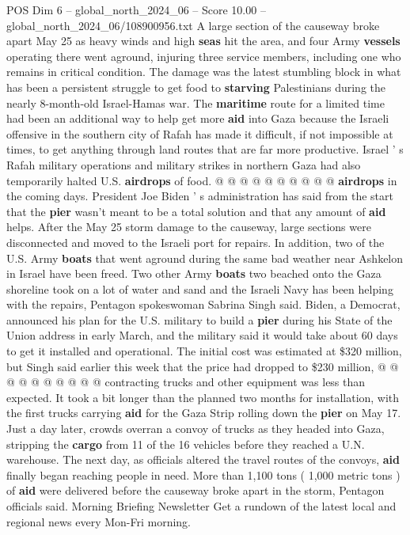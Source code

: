 \begin{textsample}{POS Dim 6 – global\_north\_2024\_06 – Score 10.00 – global\_north\_2024\_06/108900956.txt}
A large section of the causeway broke apart May 25 as heavy winds and high \textbf{seas} hit the area, and four Army \textbf{vessels} operating there went aground, injuring three service members, including one who remains in critical condition.
The damage was the latest stumbling block in what has been a persistent struggle to get food to \textbf{starving} Palestinians during the nearly 8-month-old Israel-Hamas war.
The \textbf{maritime} route for a limited time had been an additional way to help get more \textbf{aid} into Gaza because the Israeli offensive in the southern city of Rafah has made it difficult, if not impossible at times, to get anything through land routes that are far more productive.
Israel ' s Rafah military operations and military strikes in northern Gaza had also temporarily halted U.S. \textbf{airdrops} of food. @ @ @ @ @ @ @ @ @ @ \textbf{airdrops} in the coming days.
President Joe Biden ' s administration has said from the start that the \textbf{pier} wasn't meant to be a total solution and that any amount of \textbf{aid} helps.
After the May 25 storm damage to the causeway, large sections were disconnected and moved to the Israeli port for repairs.
In addition, two of the U.S.
Army \textbf{boats} that went aground during the same bad weather near Ashkelon in Israel have been freed.
Two other Army \textbf{boats} two beached onto the Gaza shoreline took on a lot of water and sand and the Israeli Navy has been helping with the repairs, Pentagon spokeswoman Sabrina Singh said.
Biden, a Democrat, announced his plan for the U.S. military to build a \textbf{pier} during his State of the Union address in early March, and the military said it would take about 60 days to get it installed and operational.
The initial cost was estimated at \$320 million, but Singh said earlier this week that the price had dropped to \$230 million, @ @ @ @ @ @ @ @ @ @ contracting trucks and other equipment was less than expected.
It took a bit longer than the planned two months for installation, with the first trucks carrying \textbf{aid} for the Gaza Strip rolling down the \textbf{pier} on May 17.
Just a day later, crowds overran a convoy of trucks as they headed into Gaza, stripping the \textbf{cargo} from 11 of the 16 vehicles before they reached a U.N. warehouse.
The next day, as officials altered the travel routes of the convoys, \textbf{aid} finally began reaching people in need.
More than 1,100 tons ( 1,000 metric tons ) of \textbf{aid} were delivered before the causeway broke apart in the storm, Pentagon officials said.
Morning Briefing Newsletter Get a rundown of the latest local and regional news every Mon-Fri morning.

\end{textsample}
